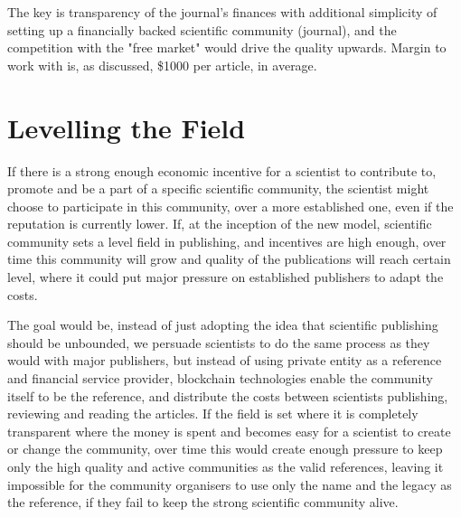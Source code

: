 \documentclass[12pt, a4paper]{article}
\begin{document}
The key is transparency of the journal's finances with additional simplicity of setting up a financially backed scientific community (journal), and the competition with the "free market" would drive the quality upwards. Margin to work with is, as discussed, \$1000 per article, in average. 


\section{Levelling the Field}
If there is a strong enough economic incentive for a scientist to contribute to, promote and be a part of a specific scientific community, the scientist might choose to participate in this community, over a more established one, even if the reputation is currently lower. If, at the inception of the new model, scientific community sets a level field in publishing, and incentives are high enough, over time this community will grow and quality of the publications will reach certain level, where it could put major pressure on established publishers to adapt the costs.

The goal would be, instead of just adopting the idea that scientific publishing should be unbounded, we persuade scientists to do the same process as they would with major publishers, but instead of using private entity as a reference and financial service provider, blockchain technologies enable the community itself to be the reference, and distribute the costs between scientists publishing, reviewing and reading the articles. If the field is set where it is completely transparent where the money is spent and becomes easy for a scientist to create or change the community, over time this would create enough pressure to keep only the high quality and active communities as the valid references, leaving it impossible for the community organisers to use only the name and the legacy as the reference, if they fail to keep the strong scientific community alive.
\end{document}
